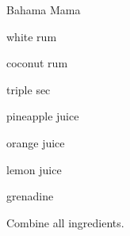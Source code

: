 \begin{recipe}{Bahama Mama}{}{}

\begin{ingredients}
\item {} white rum
\item \C{\threequarter} coconut rum
\item \C{\quarter} triple sec
\item {} pineapple juice
\item {} orange juice
\item \C{\quarter} lemon juice
\item \C{\quarter} grenadine
\end{ingredients}

\begin{directions}
\item Combine all ingredients.
\end{directions}

\end{recipe}
